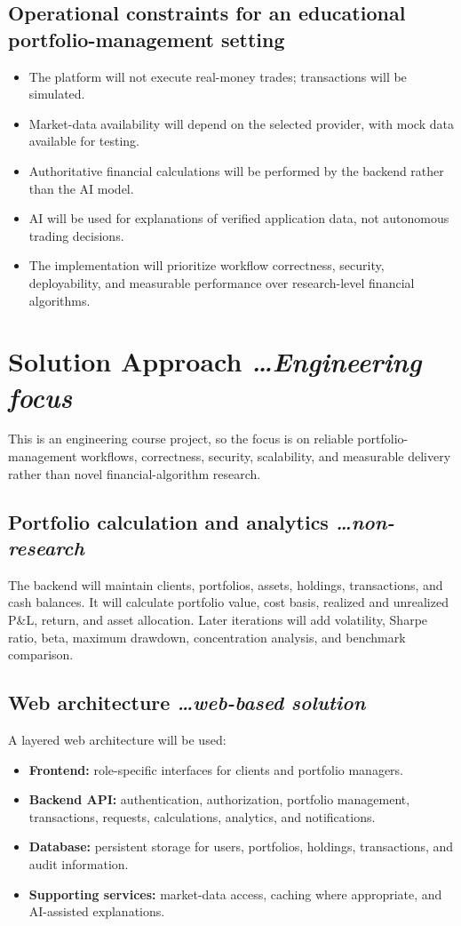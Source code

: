\documentclass[11pt,a4paper]{article}
\newcommand{\BvrHint}[1]{{\normalfont\normalsize\itshape\hfill #1}}
\begin{document}
\subsection{Operational constraints for an educational portfolio-management setting}
\begin{itemize}[leftmargin=0.7cm]
\item The platform will not execute real-money trades; transactions will be simulated.
\item Market-data availability will depend on the selected provider, with mock data available for testing.
\item Authoritative financial calculations will be performed by the backend rather than the AI model.
\item AI will be used for explanations of verified application data, not autonomous trading decisions.
\item The implementation will prioritize workflow correctness, security, deployability, and measurable performance over research-level financial algorithms.
\end{itemize}

\section{Solution Approach \BvrHint{\ldots Engineering focus}}
This is an engineering course project, so the focus is on reliable portfolio-management workflows, correctness, security, scalability, and measurable delivery rather than novel financial-algorithm research.

\subsection{Portfolio calculation and analytics \BvrHint{\ldots non-research}}
The backend will maintain clients, portfolios, assets, holdings, transactions, and cash balances. It will calculate portfolio value, cost basis, realized and unrealized P\&L, return, and asset allocation. Later iterations will add volatility, Sharpe ratio, beta, maximum drawdown, concentration analysis, and benchmark comparison.

\subsection{Web architecture \BvrHint{\ldots web-based solution}}
A layered web architecture will be used:
\begin{itemize}[leftmargin=0.7cm]
\item \textbf{Frontend:} role-specific interfaces for clients and portfolio managers.
\item \textbf{Backend API:} authentication, authorization, portfolio management, transactions, requests, calculations, analytics, and notifications.
\item \textbf{Database:} persistent storage for users, portfolios, holdings, transactions, and audit information.
\item \textbf{Supporting services:} market-data access, caching where appropriate, and AI-assisted explanations.
\end{itemize}
\end{document}

